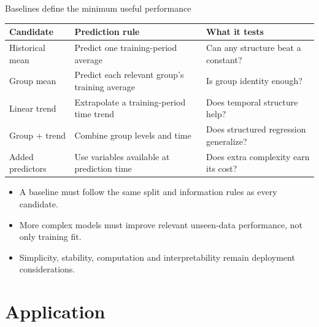 \documentclass[10pt,aspectratio=169]{beamer}
\begin{document}
\begin{frame}{Baselines define the minimum useful performance}

\small

\begin{tabularx}{\textwidth}{@{}p{}X X@{}}
\toprule
\textbf{Candidate} & \textbf{Prediction rule} & \textbf{What it tests} \\
\midrule
Historical mean & Predict one training-period average & Can any structure beat a constant? \\
Group mean & Predict each relevant group's training average & Is group identity enough? \\
Linear trend & Extrapolate a training-period time trend & Does temporal structure help? \\
Group + trend & Combine group levels and time & Does structured regression generalize? \\
Added predictors & Use variables available at prediction time & Does extra complexity earn its cost? \\
\bottomrule
\end{tabularx}

\vspace{0.30cm}

\begin{itemize}
  \item A baseline must follow the same split and information rules as every candidate.
  \item More complex models must improve relevant unseen-data performance, not only training fit.
  \item Simplicity, stability, computation and interpretability remain deployment considerations.
\end{itemize}

\end{frame}


\section{Application}
\end{document}
